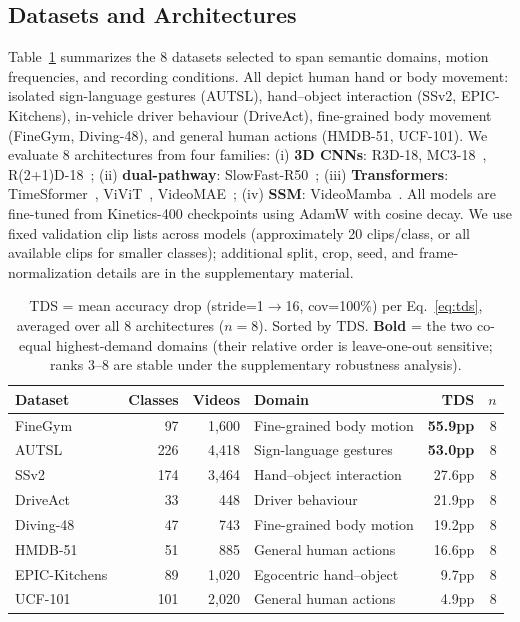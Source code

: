 \documentclass[a4paper, 10pt, conference]{ieeeconf}
\newcommand{\tabtight}{\setlength{\tabcolsep}{3.5pt}\renewcommand{\arraystretch}{1.10}}
\newcommand{\TDS}{\textsc{TDS}}
\begin{document}
\subsection{Datasets and Architectures}

Table~\ref{tab:datasets} summarizes the 8 datasets selected to span semantic domains, motion frequencies, and recording conditions. All depict human hand or body movement: isolated sign-language gestures (AUTSL), hand--object interaction (SSv2, EPIC-Kitchens), in-vehicle driver behaviour (DriveAct), fine-grained body movement (FineGym, Diving-48), and general human actions (HMDB-51, UCF-101). We evaluate 8 architectures from four families: (i) \textbf{3D CNNs}: R3D-18, MC3-18~\cite{tran2019video}, R(2+1)D-18~\cite{tran2018r2plus1d}; (ii) \textbf{dual-pathway}: SlowFast-R50~\cite{feichtenhofer2019slowfast}; (iii) \textbf{Transformers}: TimeSformer~\cite{bertasius2021timesformer}, ViViT~\cite{arnab2021vivit}, VideoMAE~\cite{tong2022videomae}; (iv) \textbf{SSM}: VideoMamba~\cite{li2024videomamba}. All models are fine-tuned from Kinetics-400 checkpoints using AdamW with cosine decay. We use fixed validation clip lists across models (approximately 20 clips/class, or all available clips for smaller classes); additional split, crop, seed, and frame-normalization details are in the supplementary material.

\begin{table}[t]
\centering
\caption{\TDS{} = mean accuracy drop (stride=1$\to$16, cov=100\%) per Eq.~\ref{eq:tds}, averaged over all 8 architectures ($n{=}8$). Sorted by \TDS{}. \textbf{Bold} = the two co-equal highest-demand domains (their relative order is leave-one-out sensitive; ranks 3--8 are stable under the supplementary robustness analysis).}
\label{tab:datasets}
\scriptsize\tabtight
\begin{tabular}{l r r l r r}
\toprule
Dataset & Classes & Videos & Domain & \TDS{} & $n$ \\
\midrule
FineGym~\cite{shao2020finegym}       &  97 & 1,600 & Fine-grained body motion & \textbf{55.9pp} & 8 \\
AUTSL~\cite{sincan2020autsl}         & 226 & 4,418 & Sign-language gestures & \textbf{53.0pp} & 8 \\
SSv2~\cite{goyal2017ssv2}            & 174 & 3,464 & Hand--object interaction & 27.6pp          & 8 \\
DriveAct~\cite{martin2019driveact}   &  33 &   448 & Driver behaviour & 21.9pp          & 8 \\
Diving-48~\cite{li2018diving48}      &  47 &   743 & Fine-grained body motion & 19.2pp          & 8 \\
HMDB-51~\cite{kuehne2011hmdb}        &  51 &   885 & General human actions & 16.6pp          & 8 \\
EPIC-Kitchens~\cite{damen2022epic}   &  89 & 1,020 & Egocentric hand--object &  9.7pp          & 8 \\
UCF-101~\cite{soomro2012ucf101}      & 101 & 2,020 & General human actions &  4.9pp          & 8 \\
\bottomrule
\end{tabular}
\end{table}
\end{document}
